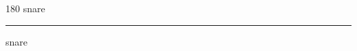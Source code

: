 
\begin{frame}
\begin{center}
\begin{turn}{180}
{\fontsize{2.5cm}{1em}\selectfont snare}
\end{turn}
\vspace{1em}\par  
\hrule
\vspace{1em}\par  
{\fontsize{2.5cm}{1em}\selectfont snare}
\end{center}
\end{frame}
